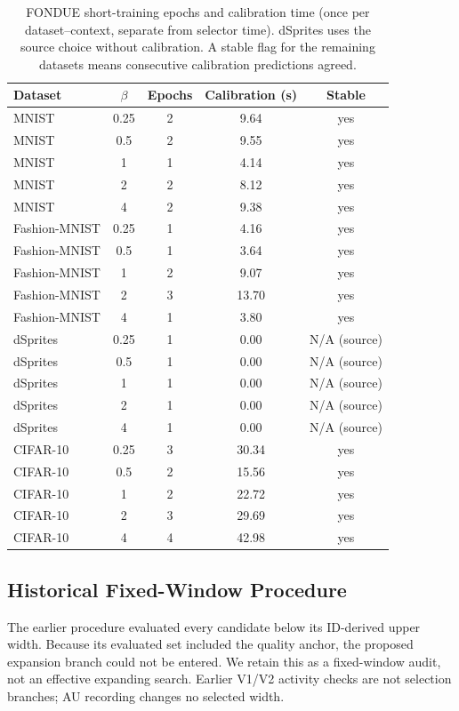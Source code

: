 \documentclass[make,article,submit,pdftex,moreauthors]{Definitions/mdpi}
\begin{document}
\begin{table}[H]
\caption{FONDUE short-training epochs and calibration time (once per dataset--context, separate from selector time). dSprites uses the source choice without calibration. A stable flag for the remaining datasets means consecutive calibration predictions agreed.}\label{tab:epochs}
\small
\setlength{\tabcolsep}{3.5pt}
\begin{tabular*}{\textwidth}{@{\extracolsep{\fill}}lcccc@{}}
\toprule
Dataset & $\beta$ & Epochs & Calibration (s) & Stable \\
\midrule
MNIST & 0.25 & 2 & 9.64 & yes \\
MNIST & 0.5 & 2 & 9.55 & yes \\
MNIST & 1 & 1 & 4.14 & yes \\
MNIST & 2 & 2 & 8.12 & yes \\
MNIST & 4 & 2 & 9.38 & yes \\
Fashion-MNIST & 0.25 & 1 & 4.16 & yes \\
Fashion-MNIST & 0.5 & 1 & 3.64 & yes \\
Fashion-MNIST & 1 & 2 & 9.07 & yes \\
Fashion-MNIST & 2 & 3 & 13.70 & yes \\
Fashion-MNIST & 4 & 1 & 3.80 & yes \\
dSprites & 0.25 & 1 & 0.00 & N/A (source) \\
dSprites & 0.5 & 1 & 0.00 & N/A (source) \\
dSprites & 1 & 1 & 0.00 & N/A (source) \\
dSprites & 2 & 1 & 0.00 & N/A (source) \\
dSprites & 4 & 1 & 0.00 & N/A (source) \\
CIFAR-10 & 0.25 & 3 & 30.34 & yes \\
CIFAR-10 & 0.5 & 2 & 15.56 & yes \\
CIFAR-10 & 1 & 2 & 22.72 & yes \\
CIFAR-10 & 2 & 3 & 29.69 & yes \\
CIFAR-10 & 4 & 4 & 42.98 & yes \\
\bottomrule
\end{tabular*}
\end{table}


\subsection{Historical Fixed-Window Procedure}\label{app:legacy}
The earlier procedure evaluated every candidate below its ID-derived
upper width. Because its evaluated set included the quality anchor,
the proposed expansion branch could not be entered. We retain this as
a fixed-window audit, not an effective expanding search. Earlier V1/V2
activity checks are not selection branches; AU recording changes no
selected width.
\end{document}
